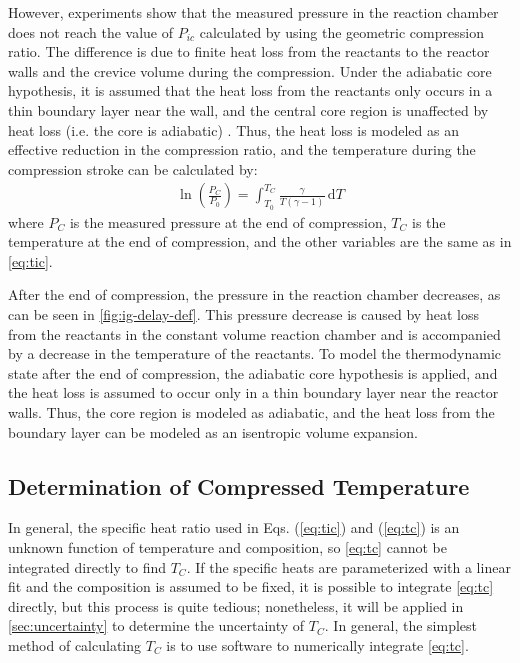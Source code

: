 \documentclass[12pt, letterpaper]{article}
\begin{document}
However, experiments show that the measured pressure in the reaction chamber
does not reach the value of $P_{ic}$ calculated by using the geometric
compression ratio. The difference is due to finite heat loss from the
reactants to the reactor walls and the crevice volume during the
compression. Under the adiabatic core hypothesis, it is assumed that
the heat loss from the reactants only occurs in a thin boundary layer
near the wall, and the central core region is unaffected by heat loss
(i.e. the core is adiabatic) \cite{Desgroux1995}. Thus, the heat
loss is modeled as an effective reduction in the compression ratio, and
the temperature during the compression stroke can be calculated by:
%
\begin{align}
\ln\left(\frac{P_{C}}{P_0}\right) = \int_{T_0}^{T_{C}} \! \frac{\gamma}{T\left(\gamma-1\right)} \, \mathrm{d} T
\label{eq:tc}
\end{align}
%
where $P_C$ is the measured pressure at the end of compression, $T_C$
is the temperature at the end of compression, and the other variables
are the same as in \autoref{eq:tic}.

After the end of compression, the pressure in the reaction chamber
decreases, as can be seen in \autoref{fig:ig-delay-def}. This pressure
decrease is caused by heat loss from the reactants in the constant volume reaction
chamber and is accompanied by a decrease in the temperature of the
reactants. To model the thermodynamic state after the end of compression,
the adiabatic core hypothesis is applied, and the heat loss is
assumed to occur only in a thin boundary layer near the reactor walls.
Thus, the core region is modeled as adiabatic, and the heat loss
from the boundary layer can be modeled as an isentropic volume
expansion.

\subsection{Determination of Compressed Temperature}

In general, the specific heat ratio used in Eqs. (\ref{eq:tic}) and
(\ref{eq:tc}) is an unknown function of temperature and composition,
so \autoref{eq:tc} cannot be integrated directly to find $T_C$. If
the specific heats are parameterized with a linear fit and the
composition is assumed to be fixed, it is possible to integrate \autoref{eq:tc} directly,
but this process is quite tedious; nonetheless, it will be applied in
\autoref{sec:uncertainty} to determine the uncertainty of $T_C$. In
general, the simplest method of calculating $T_C$ is to use software
to numerically integrate \autoref{eq:tc}.
\end{document}
